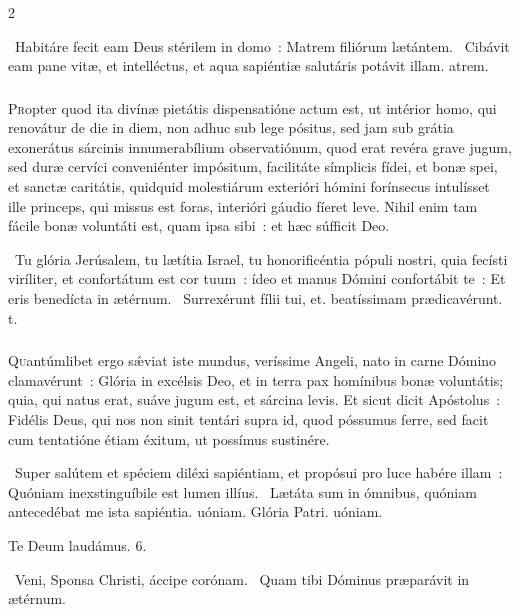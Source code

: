 \documentclass[9pt,twoside]{extarticle}
\begin{document}
\begin{multicols}{2}
{\begin{tightlist}{}
\item {}~Habitáre fecit eam Deus stérilem in domo~: \textred{*} Matrem filiórum lætántem. ~Cibávit eam pane vitæ, et intelléctus, et aqua sapiéntiæ salutáris potávit illam. atrem.
\end{tightlist}

\subsubsection*{\center {}}
\lettrine{P}ropter quod ita divínæ pietátis dispensatióne actum est, ut intérior homo, qui renovátur de die in diem, non adhuc sub lege pósitus, sed jam sub grátia exonerátus sárcinis innumerabílium observatiónum, quod erat revéra grave jugum, sed duræ cervíci conveniénter impósitum, facilitáte símplicis fídei, et bonæ spei, et sanctæ caritátis, quidquid molestiárum exterióri hómini forínsecus intulísset ille princeps, qui missus est foras, interióri gáudio fíeret leve. Nihil enim tam fácile bonæ voluntáti est, quam ipsa sibi~: et hæc súfficit Deo.

\begin{tightlist}{}
\item {}~Tu glória Jerúsalem, tu lætítia Israel, tu honorificéntia pópuli nostri, quia fecísti viríliter, et confortátum est cor tuum~: ídeo et manus Dómini confortábit te~: \textred{*} Et eris benedícta in ætérnum. ~Surrexérunt fílii tui, et. beatíssimam prædicavérunt. t.
\end{tightlist}

\subsubsection*{\center {}}
\lettrine{Q}uantúmlibet ergo sǽviat iste mundus, veríssime Angeli, nato in carne Dómino clamavérunt~: Glória in excélsis Deo, et in terra pax homínibus bonæ voluntátis; quia, qui natus erat, suáve jugum est, et sárcina levis. Et sicut dicit Apóstolus~: Fidélis Deus, qui nos non sinit tentári supra id, quod póssumus ferre, sed facit cum tentatióne étiam éxitum, ut possímus sustinére.

\begin{tightlist}{}
\item {}~Super salútem et spéciem diléxi sapiéntiam, et propósui pro luce habére illam~: \textred{*} Quóniam inexstinguíbile est lumen illíus. ~Lætáta sum in ómnibus, quóniam antecedébat me ista sapiéntia. uóniam. Glória Patri. uóniam.
\item Te Deum laudámus. 6.
\item {}~Veni, Sponsa Christi, áccipe corónam. ~Quam tibi Dóminus præparávit in ætérnum.
\end{tightlist}

}
\end{multicols}
\end{document}
